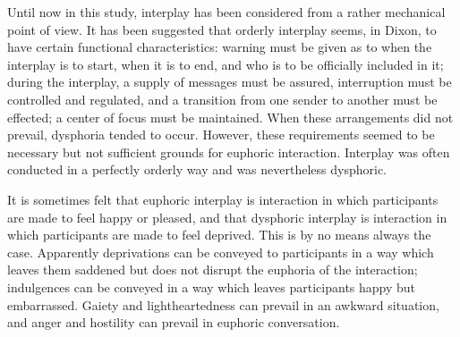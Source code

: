 \documentclass[twoside,symmetric,nobib,justified]{tufte-book}
\begin{document}
Until now in this study, interplay has been considered from a rather
mechanical point of view. It has been suggested that orderly interplay
seems, in Dixon, to have certain functional characteristics: warning
must be given as to when the interplay is to start, when it is to end,
and who is to be officially included in it; during the interplay, a
supply of messages must be assured, interruption must be controlled and
regulated, and a transition from one sender to another must be effected;
a center of focus must be maintained. When these arrangements did not
prevail, dysphoria tended to occur. However, these requirements seemed
to be necessary but not sufficient grounds for euphoric interaction.
Interplay was often conducted in a perfectly orderly way and was
nevertheless dysphoric.

It is sometimes felt that euphoric interplay is interaction in which
participants are made to feel happy or pleased, and that dysphoric
interplay is interaction in which participants are made to feel
deprived. This is by no means always the case. Apparently deprivations
can be conveyed to participants in a way which leaves them saddened but
does not disrupt the euphoria of the interaction; indulgences can be
conveyed in a way which leaves participants happy but embarrassed.
Gaiety and lightheartedness can prevail in an awkward situation, and
anger and hostility can prevail in euphoric conversation.
\end{document}
